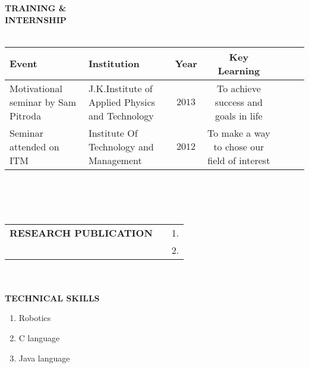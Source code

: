 \documentclass[10pt]{article}
\begin{document}
		\textbf{TRAINING \& \\ INTERNSHIP}\\ \\
		\begin{tabular}{|p{1in}|p{2in}|c|c|p{1in}|c|l|}
			\hline
			\textbf{Event} & \textbf{Institution} & \textbf{Year} & \textbf{Key Learning}\\
			\hline 
			
			Motivational seminar by Sam Pitroda & J.K.Institute of Applied Physics and Technology & $2013$ & To achieve success and goals in life\\
			Seminar attended on ITM & Institute Of Technology and Management & $2012$ & To make a way to chose our field of interest\\
			\hline
		\end{tabular} \\ \\ \\
		\begin{tabular}{l c l}
			\textbf{RESEARCH PUBLICATION} & &  1.\\
			& &  2.
		\end{tabular}\\ \\
		\textbf{TECHNICAL SKILLS}\\ 
		\begin{enumerate}
			\item Robotics
			\item C language 
			\item Java language
		\end{enumerate} 
	
\end{document}
